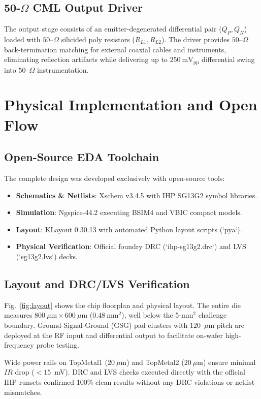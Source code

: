\documentclass[conference]{IEEEtran}
\begin{document}
\subsection{50-$\Omega$ CML Output Driver}
The output stage consists of an emitter-degenerated differential pair ($Q_P, Q_N$) loaded with $50\text{--}\Omega$ silicided poly resistors ($R_{L1}, R_{L2}$). The driver provides $50\text{--}\Omega$ back-termination matching for external coaxial cables and instruments, eliminating reflection artifacts while delivering up to $250~\text{mV}_{\text{pp}}$ differential swing into $50\text{--}\Omega$ instrumentation.

\section{Physical Implementation and Open Flow}

\subsection{Open-Source EDA Toolchain}
The complete design was developed exclusively with open-source tools:
\begin{itemize}
    \item \textbf{Schematics \& Netlists}: Xschem v3.4.5 with IHP SG13G2 symbol libraries.
    \item \textbf{Simulation}: Ngspice-44.2 executing BSIM4 and VBIC compact models.
    \item \textbf{Layout}: KLayout 0.30.13 with automated Python layout scripts (`pya`).
    \item \textbf{Physical Verification}: Official foundry DRC (`ihp-sg13g2.drc`) and LVS (`sg13g2.lvs`) decks.
\end{itemize}

\subsection{Layout and DRC/LVS Verification}
Fig.~\ref{fig:layout} shows the chip floorplan and physical layout. The entire die measures $800~\mu\text{m} \times 600~\mu\text{m}$ ($0.48~\text{mm}^2$), well below the 5-$\text{mm}^2$ challenge boundary. Ground-Signal-Ground (GSG) pad clusters with $120\text{--}\mu\text{m}$ pitch are deployed at the RF input and differential output to facilitate on-wafer high-frequency probe testing. 

Wide power rails on TopMetal1 ($20~\mu\text{m}$) and TopMetal2 ($20~\mu\text{m}$) ensure minimal $IR$ drop ($< 15$~mV). DRC and LVS checks executed directly with the official IHP runsets confirmed 100\% clean results without any DRC violations or netlist mismatches.
\end{document}
